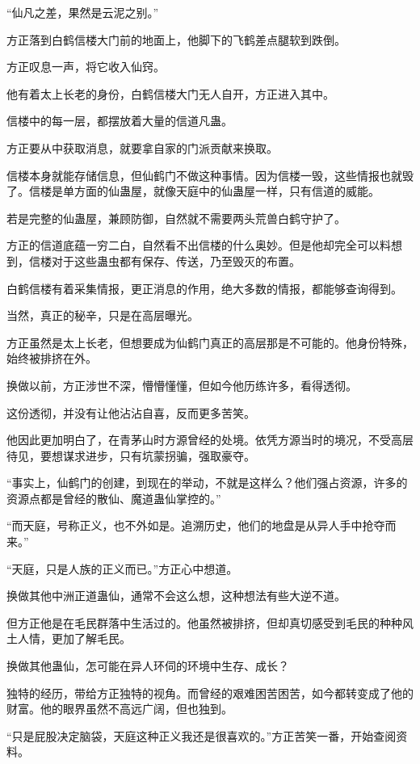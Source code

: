 \begin{this_body}
“仙凡之差，果然是云泥之别。”

方正落到白鹤信楼大门前的地面上，他脚下的飞鹤差点腿软到跌倒。

方正叹息一声，将它收入仙窍。

他有着太上长老的身份，白鹤信楼大门无人自开，方正进入其中。

信楼中的每一层，都摆放着大量的信道凡蛊。

方正要从中获取消息，就要拿自家的门派贡献来换取。

信楼本身就能存储信息，但仙鹤门不做这种事情。因为信楼一毁，这些情报也就毁了。信楼是单方面的仙蛊屋，就像天庭中的仙蛊屋一样，只有信道的威能。

若是完整的仙蛊屋，兼顾防御，自然就不需要两头荒兽白鹤守护了。

方正的信道底蕴一穷二白，自然看不出信楼的什么奥妙。但是他却完全可以料想到，信楼对于这些蛊虫都有保存、传送，乃至毁灭的布置。

白鹤信楼有着采集情报，更正消息的作用，绝大多数的情报，都能够查询得到。

当然，真正的秘辛，只是在高层曝光。

方正虽然是太上长老，但想要成为仙鹤门真正的高层那是不可能的。他身份特殊，始终被排挤在外。

换做以前，方正涉世不深，懵懵懂懂，但如今他历练许多，看得透彻。

这份透彻，并没有让他沾沾自喜，反而更多苦笑。

他因此更加明白了，在青茅山时方源曾经的处境。依凭方源当时的境况，不受高层待见，要想谋求进步，只有坑蒙拐骗，强取豪夺。

“事实上，仙鹤门的创建，到现在的举动，不就是这样么？他们强占资源，许多的资源点都是曾经的散仙、魔道蛊仙掌控的。”

“而天庭，号称正义，也不外如是。追溯历史，他们的地盘是从异人手中抢夺而来。”

“天庭，只是人族的正义而已。”方正心中想道。

换做其他中洲正道蛊仙，通常不会这么想，这种想法有些大逆不道。

但方正他是在毛民群落中生活过的。他虽然被排挤，但却真切感受到毛民的种种风土人情，更加了解毛民。

换做其他蛊仙，怎可能在异人环伺的环境中生存、成长？

独特的经历，带给方正独特的视角。而曾经的艰难困苦困苦，如今都转变成了他的财富。他的眼界虽然不高远广阔，但也独到。

“只是屁股决定脑袋，天庭这种正义我还是很喜欢的。”方正苦笑一番，开始查阅资料。


\end{this_body}
